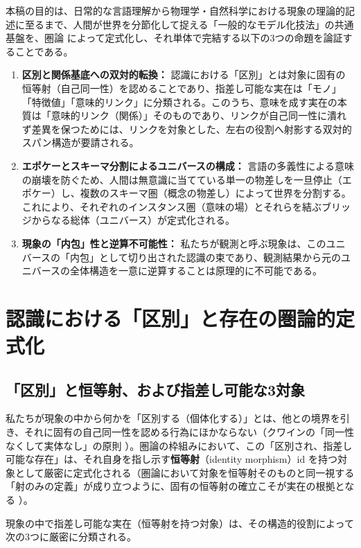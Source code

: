 \documentclass[11pt,a4paper,luatex]{jlreq}
\theoremstyle{definition}
\theoremstyle{plain}
\begin{document}
本稿の目的は、日常的な言語理解から物理学・自然科学における現象の理論的記述に至るまで、人間が世界を分節化して捉える「一般的なモデル化技法」の共通基盤を、圏論 \cite{maclane1998} によって定式化し、それ単体で完結する以下の3つの命題を論証することである。

\begin{enumerate}
    \item \textbf{区別と関係基底への双対的転換：} 認識における「区別」とは対象に固有の恒等射（自己同一性）を認めることであり、指差し可能な実在は「モノ」「特徴値」「意味的リンク」に分類される。このうち、意味を成す実在の本質は「意味的リンク（関係）」そのものであり、リンクが自己同一性に潰れず差異を保つためには、リンクを対象とした、左右の役割へ射影する双対的スパン構造が要請される。
    \item \textbf{エポケーとスキーマ分割によるユニバースの構成：} 言語の多義性による意味の崩壊を防ぐため、人間は無意識に当てている単一の物差しを一旦停止（エポケー）し、複数のスキーマ圏（概念の物差し）によって世界を分割する。これにより、それぞれのインスタンス圏（意味の場）とそれらを結ぶブリッジからなる総体（ユニバース）が定式化される。
    \item \textbf{現象の「内包」性と逆算不可能性：} 私たちが観測と呼ぶ現象は、このユニバースの「内包」として切り出された認識の束であり、観測結果から元のユニバースの全体構造を一意に逆算することは原理的に不可能である。
\end{enumerate}

\section{認識における「区別」と存在の圏論的定式化}

\subsection{「区別」と恒等射、および指差し可能な3対象}

私たちが現象の中から何かを「区別する（個体化する）」とは、他との境界を引き、それに固有の自己同一性を認める行為にほかならない（クワインの「同一性なくして実体なし」の原則 \cite{quine1969}）。圏論の枠組みにおいて、この「区別され、指差し可能な存在」は、それ自身を指し示す\textbf{恒等射}（identity morphism）$\mathrm{id}$ を持つ対象として厳密に定式化される（圏論において対象を恒等射そのものと同一視する「射のみの定義」が成り立つように、固有の恒等射の確立こそが実在の根拠となる \cite{maclane1998}）。

現象の中で指差し可能な実在（恒等射を持つ対象）は、その構造的役割によって次の3つに厳密に分類される。
\end{document}

